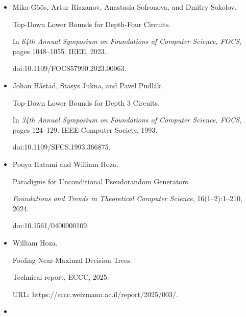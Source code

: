 \documentclass[10pt,a4paper]{article}
\begin{document}
\begin{itemize}
Mika Göös, Pritish Kamath, Toniann Pitassi, and Thomas Watson.


Query-to-Communication Lifting for $\textsf{P}^{\textsf{NP}}$.


\emph{Computational Complexity}, 28(1):113–144, 2019.





\item[] 
[11]

Mika Göös, Artur Riazanov, Anastasia Sofronova, and Dmitry Sokolov.


Top-Down Lower Bounds for Depth-Four Circuits.


In \emph{64th Annual Symposium on Foundations of Computer Science,
FOCS}, pages 1048–1055. IEEE, 2023.


doi:10.1109/FOCS57990.2023.00063.





\item[] 
[12]

Johan Håstad, Stasys Jukna, and Pavel Pudlák.


Top-Down Lower Bounds for Depth $3$ Circuits.


In \emph{34th Annual Symposium on Foundations of Computer Science,
FOCS}, pages 124–129. IEEE Computer Society, 1993.


doi:10.1109/SFCS.1993.366875.





\item[] 
[13]

Pooya Hatami and William Hoza.


Paradigms for Unconditional Pseudorandom Generators.


\emph{Foundations and Trends in Theoretical Computer Science},
16(1–2):1–210, 2024.


doi:10.1561/0400000109.





\item[] 
[14]

William Hoza.


Fooling Near-Maximal Decision Trees.


Technical report, ECCC, 2025.


URL: https://eccc.weizmann.ac.il/report/2025/003/.





\item[] 
[15]


\end{itemize}
\end{document}
